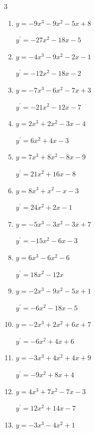 \begin{multicols}{3}
\begin{enumerate}
        $\displaystyle y^{\prime}=-24x^{2}-8x-4$

  \item $y=-9x^{3}-9x^{2}-5x+8$

        $\displaystyle y^{\prime}=-27x^{2}-18x-5$

  \item $y=-4x^{3}-9x^{2}-2x-1$

        $\displaystyle y^{\prime}=-12x^{2}-18x-2$

  \item $y=-7x^{3}-6x^{2}-7x+3$

        $\displaystyle y^{\prime}=-21x^{2}-12x-7$

\columnbreak %

  \item $y=2x^{3}+2x^{2}-3x-4$

        $\displaystyle y^{\prime}=6x^{2}+4x-3$

  \item $y=7x^{3}+8x^{2}-8x-9$

        $\displaystyle y^{\prime}=21x^{2}+16x-8$

  \item $y=8x^{3}+x^{2}-x-3$

        $\displaystyle y^{\prime}=24x^{2}+2x-1$

  \item $y=-5x^{3}-3x^{2}-3x+7$

        $\displaystyle y^{\prime}=-15x^{2}-6x-3$

  \item $y=6x^{3}-6x^{2}-6$

        $\displaystyle y^{\prime}=18x^{2}-12x$

  \item $y=-2x^{3}-9x^{2}-5x+1$

        $\displaystyle y^{\prime}=-6x^{2}-18x-5$

  \item $y=-2x^{3}+2x^{2}+6x+7$

        $\displaystyle y^{\prime}=-6x^{2}+4x+6$

  \item $y=-3x^{3}+4x^{2}+4x+9$

        $\displaystyle y^{\prime}=-9x^{2}+8x+4$

  \item $y=4x^{3}+7x^{2}-7x-3$

        $\displaystyle y^{\prime}=12x^{2}+14x-7$

  \item $y=-3x^{3}-4x^{2}+1$


\end{enumerate}
\end{multicols}
